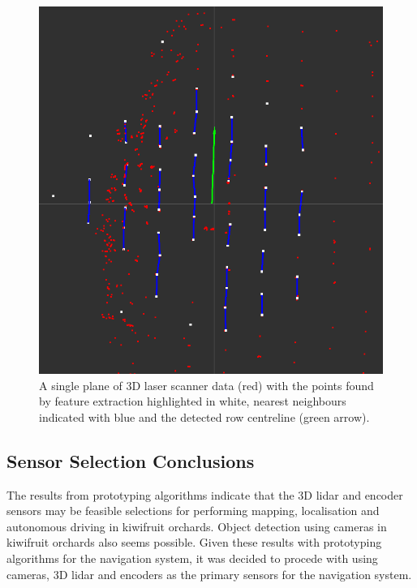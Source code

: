 \documentclass[preprint,authoryear,12pt]{elsarticle}
\begin{document}
        \begin{figure}[htb]
            \centering
            \includegraphics[width=\linewidth]{imgs/photos/lastLidarFrame.png}
            \caption{
                A single plane of 3D laser scanner data (red) with the points found by feature extraction highlighted in white, nearest neighbours indicated with blue and the detected row centreline (green arrow).
            }
            \label{fig:lastLidarFrame}
        \end{figure}

\subsection{Sensor Selection Conclusions}
    The results from prototyping algorithms indicate that the 3D lidar and encoder sensors may be feasible selections for performing mapping, localisation and autonomous driving in kiwifruit orchards.
	Object detection using cameras in kiwifruit orchards also seems possible.
	Given these results with prototyping algorithms for the navigation system, it was decided to procede with using cameras, 3D lidar and encoders as the primary sensors for the navigation system.
\end{document}

